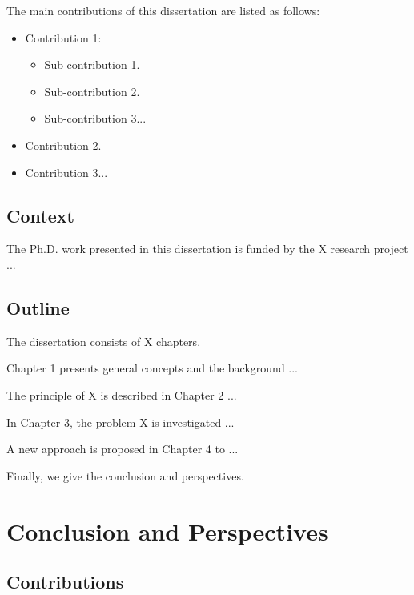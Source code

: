 \documentclass[a4paper, twoside, 12pt]{report}
\begin{document}
	The main contributions of this dissertation are listed as follows:
	\begin{itemize}
		\item Contribution 1:
		\begin{itemize}
			\item Sub-contribution 1.
			\item Sub-contribution 2.
			\item Sub-contribution 3...
		\end{itemize}
		\item Contribution 2.
		\item Contribution 3...
	\end{itemize}
	
	\section*{Context}
	
	The Ph.D. work presented in this dissertation is funded by the X research project ...
	
	\section*{Outline}
	
	The dissertation consists of X chapters. 
	
	Chapter 1 presents general concepts and the background ...
	
	The principle of X is described in Chapter 2 ...
	
	In Chapter 3, the problem X is investigated ...
	
	A new approach is proposed in Chapter 4 to ...
	
	Finally, we give the conclusion and perspectives.
	
	
	
	

	
	
	
	\chapter*{Conclusion and Perspectives}
	
	\section*{Contributions}
	
\end{document}
